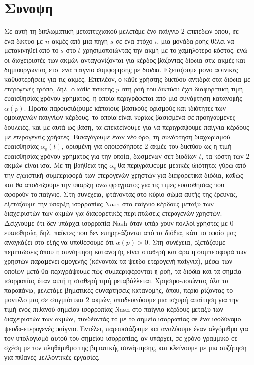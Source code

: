 \documentclass[10pt,a4paper]{book}
\newcommand{\as}{\mathrm{\alpha_s}}
\theoremstyle{definition}
\theoremstyle{comment}
\begin{document}
\thispagestyle{empty}
\null
\clearpage

\thispagestyle{empty}

\chapter*{Συνοψη}
Σε αυτή τη διπλωματική μεταπτυχιακού μελετάμε ένα παίγνιο $2$ επιπέδων όπου, σε ένα δίκτυο με $n$ ακμές από μια πηγή $s$ σε ένα στόχο $t$, μια μονάδα ροής θέλει να μετακινηθεί από το $s$ στο $t$ χρησιμοποιώντας την ακμή με το χαμηλότερο κόστος, ενώ οι διαχειριστές των ακμών ανταγωνίζονται για κέρδος βάζοντας δίοδια στις ακμές και δημιουργώντας έτσι ένα παίγνιο συμφόρησης με διόδια.
Εξετάζουμε μόνο αφινικές καθυστερήσεις για τις ακμές.
Επιπλέον, ο κάθε χρήστης δικτύου αντιδρά στα διόδια με ετερογενές τρόπο, δηλ. ο κάθε παίκτης $p$ στη ροή του δικτύου έχει διαφορετική τιμή ευαισθησίας χρόνου-χρήματος, η οποία περιγράφεται από μια συνάρτηση κατανομής $\alpha(p)$.
Πρώτα παρουσιάζουμε κάποιους βασικούς ορισμούς και ιδιότητες των ομοιογενών παιγνίων κέρδους, τα οποία είναι κυρίως βασισμένα σε προηγούμενες δουλειές, και με αυτά ως βάση, τα επεκτείνουμε για να περιγράψουμε παίγνια κέρδους με ετερογενείς χρήστες.
Εισαγάγουμε έναν νέο όρο, τη συνάρτηση διαχωρισμού ευαισθησίας $\as(t)$, ορισμένη για οποιεσδήποτε $2$ ακμές του δικτύου ως η τιμή ευαισθησίας χρόνου-χρήματος για την οποία, δωσμένων σετ διοδίων $t$, τα κόστη των $2$ ακμών είναι ίσα.
Με τη βοήθεια της $\as$ θα περιγράψουμε μερικές ιδιότητες γύρω από την εγωιστική συμπεριφορά των ετερογενών χρηστών για διαφορετικά διόδια, καθώς και θα αποδείξουμε την ύπαρξη άνω φράγματος για τις τιμές ευαισθησίας που αφορούν το παίγνιο.
Στη συνέχεια, φτάνοντας στο κύριο σώμα αυτής της έρευνας, εξετάζουμε την ύπαρξη ισορροπίας Nash στο παίγνιο κέρδους μεταξύ των διαχειριστών των ακμών για διαφορετικές περι-πτώσεις ετερογενών χρηστών.
Δείχνουμε ότι δεν υπάρχει ισορροπία Nash όταν υπάρ-χουν πολλοί χρήστες με $0$ ευαισθησία, δηλ. παίκτες που δεν επηρρεάζονται από τα διόδια, κάτι το οποίο μας αναγκάζει στο εξής να υποθέσουμε ότι $\alpha(p) > 0$.
Στη συνέχεια, εξετάζουμε περιπτώσεις όπου η συνάρτηση κατανομής είναι σταθερή και άρα η συμπεριφορά των χρηστών παραμένει ομογενής (κάνοντάς τα ψευδο-ετερογενή παίγνια), μέσω των οποίων μετά θα περιγράψουμε πώς συμπεριφέρονται η ροή, τα διόδια και τα σημεία ισορροπίας όταν αυτή η σταθερή τιμή μεταβάλλεται.
Χρησιμο-ποιώντας όλα τα παραπάνω, μελετάμε βηματικές συναρτήσεις κατανομής, όπου, περιο-ρίζοντας το μοντέλο μας σε στιγμιότυπα $2$ ακμών, αποδεικνύουμε μια ισχυρή απαίτηση για την τιμή ενός πιθανού σημείου ισορροπίας Nash στο παίγνιο κέρδους μεταξύ των διαχειριστών των ακμών, συνδέοντάς το με το σημείο ισορροπίας σε ένα ισοδύναμο ψευδο-ετερογενές παίγνιο.
Εντέλει, παρουσιάζουμε και αναλύουμε έναν αλγόριθμο για τον υπολογισμό αυτού του σημείου ισορροπίας, αν υπάρχει, σε χρόνο γραμμικό σε σχέση με τον πληθάριθμο της βηματικής συνάρτησης, και κλείνουμε με μια συζήτηση για πιθανές μελλοντικές εργασίες.
\end{document}
